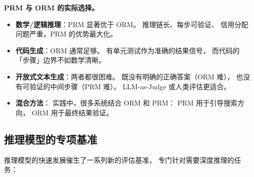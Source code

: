 \medskip\noindent\textbf{PRM 与 ORM 的实际选择。}

\begin{keybox}
\begin{itemize}[noitemsep]
  \item \textbf{数学/逻辑推理}：PRM 显著优于 ORM。
        推理链长、每步可验证、
        信用分配问题严重，PRM 的优势最大化。
  \item \textbf{代码生成}：ORM 通常足够。
        有单元测试作为准确的结果信号，
        而代码的「步骤」边界不如数学清晰。
  \item \textbf{开放式文本生成}：两者都很困难。
        既没有明确的正确答案（ORM 难），
        也没有可验证的中间步骤（PRM 难）。
        LLM-as-Judge 或人类评估更适合。
  \item \textbf{混合方法}：
        实践中，很多系统结合 ORM 和 PRM：
        PRM 用于引导搜索方向，
        ORM 用于最终结果验证。
\end{itemize}
\end{keybox}

\subsection{推理模型的专项基准}
\label{subsec:reasoning-benchmarks}

推理模型的快速发展催生了一系列新的评估基准，
专门针对需要深度推理的任务：

